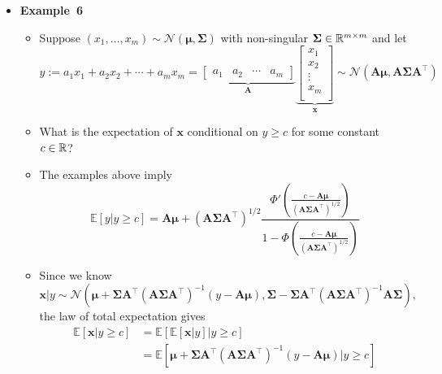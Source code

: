 \documentclass[12pt,a4paper]{article}
\begin{document}
\begin{itemize}
\item \textbf{Example~6}
  \begin{itemize}
  \item Suppose $(x_{1},\ldots ,x_{m})\sim \mathcal{N}(\bm{\mu},\bm{\Sigma})$ with non-singular $\bm{\Sigma}\in \mathbb{R}^{m\times m}$ and let
    \begin{equation}\nonumber%
      y := 
      a_{1}x_{1} + a_{2}x_{2} + \cdots + a_{m}x_{m}
      =
      \underbrace{
      \begin{bmatrix}
        a_{1} & a_{2} & \cdots & a_{m}
      \end{bmatrix}}_{\bm{A}}
    \underbrace{
      \begin{bmatrix}
        x_{1} \\
        x_{2} \\
        \vdots \\
        x_{m} \\
      \end{bmatrix}}_{\bm{x}}
    \sim
    \mathcal{N}
    \left(\bm{A}\bm{\mu}, \bm{A}\bm{\Sigma}\bm{A}^{\top}\right)
    \end{equation}
  \item What is the expectation of $\bm{x}$ conditional on $y\geq c$ for some constant $c\in \mathbb{R}$?
  \item The examples above imply
    \begin{equation}\nonumber%
      \mathbb{E}\left[y| y\geq c \right]
      =
      \bm{A}\bm{\mu} + (\bm{A}\bm{\Sigma}\bm{A}^{\top})^{1/2} \frac{\Phi'\left(\frac{c - \bm{A}\bm{\mu}}{(\bm{A}\bm{\Sigma}\bm{A}^{\top})^{1/2}}\right) }{1-\Phi\left(\frac{c - \bm{A}\bm{\mu}}{(\bm{A}\bm{\Sigma}\bm{A}^{\top})^{1/2}}\right)}
    \end{equation}
  \item Since we know
    \begin{equation}\nonumber%
      \bm{x}|y
      \sim \mathcal{N}
      \left(
        \bm{\mu}+\bm{\Sigma}\bm{A}^{\top}(\bm{A}\bm{\Sigma}\bm{A}^{\top})^{-1}(y-\bm{A}\bm{\mu}),
        \bm{\Sigma} - \bm{\Sigma}\bm{A}^{\top}(\bm{A}\bm{\Sigma}\bm{A}^{\top})^{-1}\bm{A}\bm{\Sigma}
      \right),
    \end{equation}
    the law of total expectation gives
    \begin{align}
      \mathbb{E}\left[\bm{x}|y\geq c \right]
        & = \mathbb{E}\left[\mathbb{E}\left[\bm{x}|y\right]|y\geq c \right] \nonumber \\
        & = \mathbb{E}\left[\bm{\mu}+\bm{\Sigma}\bm{A}^{\top}(\bm{A}\bm{\Sigma}\bm{A}^{\top})^{-1}(y-\bm{A}\bm{\mu}) \Big| y\geq c \right] \nonumber \\

\end{align}
\end{itemize}
\end{itemize}
\end{document}
